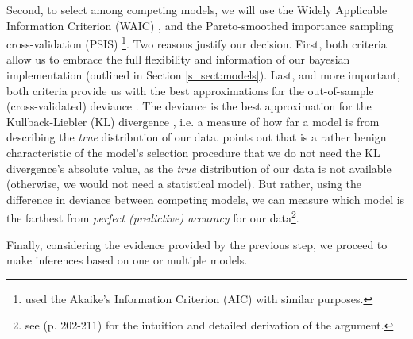 Second, to select among competing models, we will use the Widely Applicable Information Criterion (WAIC) \citep{Watanabe_2013}, and the Pareto-smoothed importance sampling cross-validation (PSIS) \citep{Vehtari_et_al_2021}\footnote{\citet{vanDaal_2020} used the Akaike’s Information Criterion (AIC) \citep{Akaike_1974} with similar purposes.}. Two reasons justify our decision. First, both criteria allow us to embrace the full flexibility and information of our bayesian implementation (outlined in Section \ref{s_sect:models}). Last, and more important, both criteria provide us with the best approximations for the out-of-sample (cross-validated) deviance \citep{McElreath_2020}. The deviance is the best approximation for the Kullback-Liebler (KL) divergence \citep{Kullback_et_al_1951}, i.e. a measure of how far a model is from describing the \textit{true} distribution of our data. \citet{McElreath_2020} points out that is a rather benign characteristic of the model's selection procedure that we do not need the KL divergence's absolute value, as the \textit{true} distribution of our data is not available (otherwise, we would not need a statistical model). But rather, using the difference in deviance between competing models, we can measure which model is the farthest from \textit{perfect (predictive) accuracy} for our data\footnote{see \citet{McElreath_2020} (p. 202-211) for the intuition and detailed derivation of the argument.}.

Finally, considering the evidence provided by the previous step, we proceed to make inferences based on one or multiple models.